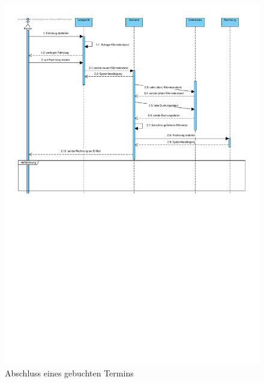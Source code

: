 \begin{figure}[!ht]
    \centering
    \includegraphics[width=\textwidth, trim = 0cm 14cm 0cm 0cm]{Bilder/Diagramme/SD_Buchungsvorgang_03.pdf}
    \caption{Abschluss eines gebuchten Termins}
    \label{img:buchung03}
\end{figure}

